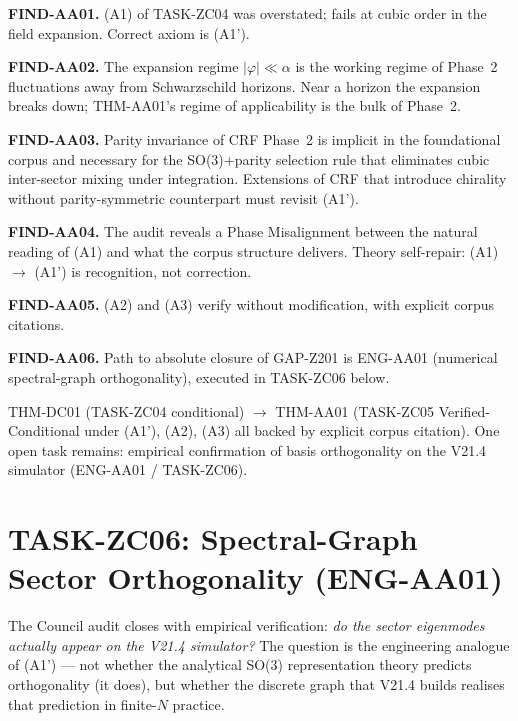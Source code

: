 \documentclass[12pt, a4paper]{article}
\begin{document}
\begin{formalbox}[title={Findings of TASK-ZC05 (FIND-AA01..06)}]
\textbf{FIND-AA01.} (A1) of TASK-ZC04 was overstated; fails at cubic
order in the field expansion. Correct axiom is (A1').

\textbf{FIND-AA02.} The expansion regime $|\varphi| \ll \alpha$ is
the working regime of Phase~2 fluctuations away from Schwarzschild
horizons. Near a horizon the expansion breaks down; THM-AA01's regime
of applicability is the bulk of Phase~2.

\textbf{FIND-AA03.} Parity invariance of CRF Phase~2 is implicit in
the foundational corpus and necessary for the SO(3)+parity selection
rule that eliminates cubic inter-sector mixing under integration.
Extensions of CRF that introduce chirality without parity-symmetric
counterpart must revisit (A1').

\textbf{FIND-AA04.} The audit reveals a Phase Misalignment between
the natural reading of (A1) and what the corpus structure delivers.
Theory self-repair: (A1) $\to$ (A1') is recognition, not correction.

\textbf{FIND-AA05.} (A2) and (A3) verify without modification, with
explicit corpus citations.

\textbf{FIND-AA06.} Path to absolute closure of GAP-Z201 is
ENG-AA01 (numerical spectral-graph orthogonality), executed in
TASK-ZC06 below.
\end{formalbox}

\begin{keybox}[title={Status After TASK-ZC05}]
THM-DC01 (TASK-ZC04 conditional) $\to$ THM-AA01 (TASK-ZC05
Verified-Conditional under (A1'), (A2), (A3) all backed by explicit
corpus citation). One open task remains: empirical confirmation of
basis orthogonality on the V21.4 simulator (ENG-AA01 / TASK-ZC06).
\end{keybox}



\section{TASK-ZC06: Spectral-Graph Sector Orthogonality (ENG-AA01)}
\label{sec:Z2-zc06}

The Council audit closes with empirical verification: \emph{do the
sector eigenmodes actually appear on the V21.4 simulator?} The
question is the engineering analogue of (A1') --- not whether the
analytical SO(3) representation theory predicts orthogonality
(it does), but whether the discrete graph that V21.4 builds
realises that prediction in finite-$N$ practice.
\end{document}
